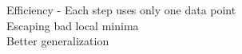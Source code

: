 \documentclass[preview]{standalone}
\begin{document}
Efficiency - Each step uses only one data point\\Escaping bad local minima\\Better generalization\\
\end{document}
